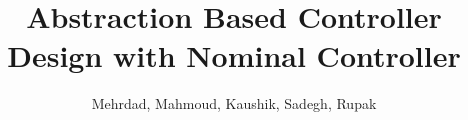 \documentclass{llncs}
\title{Abstraction Based Controller Design with Nominal Controller}
\author{Mehrdad, Mahmoud, Kaushik, Sadegh, Rupak}
\begin{document}
\maketitle

\begin{abstract}
	
\end{abstract}



	 




\end{document}
